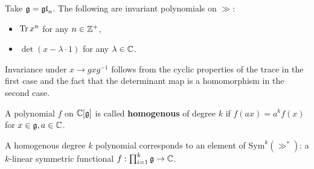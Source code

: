 		\begin{eg}
			Take $\frak{g} = \frak{gl}_n$. The following are invariant polynomials on $\gg$:
			\begin{itemize}
				\item $\mathrm{Tr}\, x^n$ for any $n \in \mathbb{Z}^+$,
				\item $\det (x - \lambda \cdot 1)$ for any  $\lambda \in \mathbb{C}$.
			\end{itemize}
			Invariance under $x \to gxg^{-1}$ follows from the cyclic properties of the trace in the first case and the fact that the determinant map is a homomorphism in the second case.
		\end{eg}
		
		\begin{defn}
			A polynomial $f$ on $\mathbb{C}[\frak{g}]$ is called \textbf{homogenous} of degree $k$ if $f(a x) = a^k f(x)$ for $x \in \frak{g}, a \in \mathbb{C}$.
		\end{defn}
		
		\begin{obs}
			A homogenous degree $k$ polynomial corresponds to an element of $\mathrm{Sym}^k (\gg^*)$: a $k$-linear symmetric functional $f: \prod_{i=1}^k \frak{g} \to \mathbb{C}$.
		\end{obs}
		
